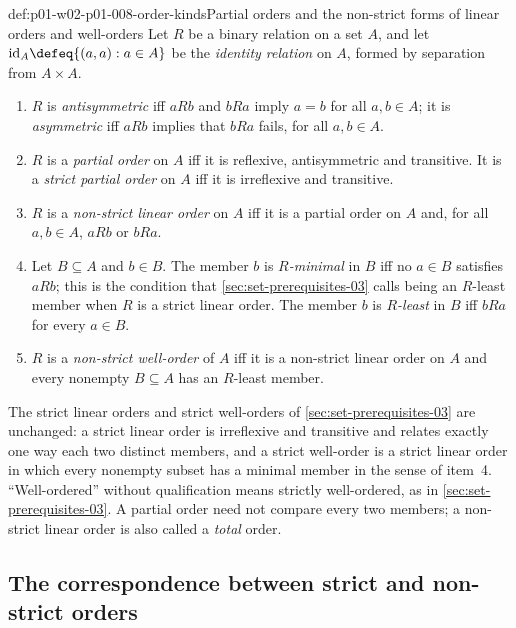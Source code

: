 \begin{hbdefinition}{def:p01-w02-p01-008-order-kinds}{Partial orders and the non-strict forms of linear orders and well-orders}
Let \(R\) be a binary relation on a set \(A\), and let
\(\mathrm{id}_A\defeq\{(a,a):a\in A\}\) be the \emph{identity relation} on
\(A\), formed by separation from \(A\times A\).
\begin{enumerate}
  \item \(R\) is \emph{antisymmetric} iff \(aRb\) and \(bRa\) imply \(a=b\)
        for all \(a,b\in A\); it is \emph{asymmetric} iff \(aRb\) implies
        that \(bRa\) fails, for all \(a,b\in A\).
  \item \(R\) is a \emph{partial order} on \(A\) iff it is reflexive,
        antisymmetric and transitive. It is a \emph{strict partial order}
        on \(A\) iff it is irreflexive and transitive.
  \item \(R\) is a \emph{non-strict linear order} on \(A\) iff it is a
        partial order on \(A\) and, for all \(a,b\in A\), \(aRb\) or
        \(bRa\).
  \item Let \(B\subseteq A\) and \(b\in B\). The member \(b\) is
        \emph{\(R\)-minimal} in \(B\) iff no \(a\in B\) satisfies \(aRb\);
        this is the condition that \cref{sec:set-prerequisites-03} calls
        being an \(R\)-least member when \(R\) is a strict linear order. The
        member \(b\) is \emph{\(R\)-least} in \(B\) iff \(bRa\) for every
        \(a\in B\).
  \item \(R\) is a \emph{non-strict well-order} of \(A\) iff it is a
        non-strict linear order on \(A\) and every nonempty
        \(B\subseteq A\) has an \(R\)-least member.
\end{enumerate}
\end{hbdefinition}

The strict linear orders and strict well-orders of
\cref{sec:set-prerequisites-03} are unchanged: a strict linear order is
irreflexive and transitive and relates exactly one way each two distinct
members, and a strict well-order is a strict linear order in which every
nonempty subset has a minimal member in the sense of item~4. ``Well-ordered''
without qualification means strictly well-ordered, as in
\cref{sec:set-prerequisites-03}. A partial order need not compare every two
members; a non-strict linear order is also called a \emph{total} order.

\subsection{The correspondence between strict and non-strict orders}
\label{sec:p01-w02-p01-008-correspondence}

